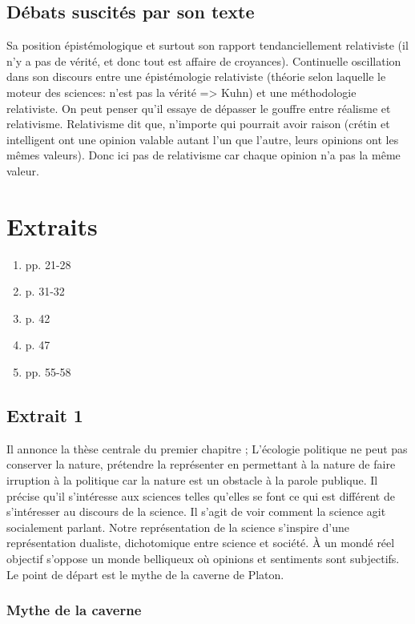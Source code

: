 \documentclass[11pt,a4paper]{article} %
\begin{document}
\subsection{Débats suscités par son texte}
Sa position épistémologique et surtout son rapport tendanciellement relativiste (il n'y a pas de vérité, et donc tout est affaire de croyances).
Continuelle oscillation dans son discours entre une épistémologie relativiste (théorie selon laquelle le moteur des sciences: n'est pas la vérité => Kuhn) et une méthodologie relativiste.
On peut penser qu'il essaye de dépasser le gouffre entre réalisme et relativisme.
Relativisme dit que, n'importe qui pourrait avoir raison (crétin et intelligent ont une opinion valable autant l'un que l'autre, leurs opinions ont les mêmes valeurs).
Donc ici pas de relativisme car chaque opinion n'a pas la même valeur.

\section{Extraits}
\begin{enumerate}
	\item pp. 21-28
	\item p. 31-32
	\item p. 42
	\item p. 47
	\item pp. 55-58
\end{enumerate}

\subsection{Extrait 1}
Il annonce la thèse centrale du premier chapitre ; L'écologie politique ne peut pas conserver la nature, prétendre la représenter en permettant à la nature de faire irruption à la politique car la nature est un obstacle à la parole publique.
Il précise qu'il s'intéresse aux sciences telles qu'elles se font ce qui est différent de s'intéresser au discours de la science.
Il s'agit de voir comment la science agit socialement parlant.
Notre représentation  de la science s'inspire d'une représentation dualiste, dichotomique entre science et société.
À un mondé réel objectif s'oppose un monde belliqueux où  opinions et sentiments sont subjectifs.
Le point de départ est le mythe de la caverne de Platon.

\subsubsection{Mythe de la caverne}
\end{document}
